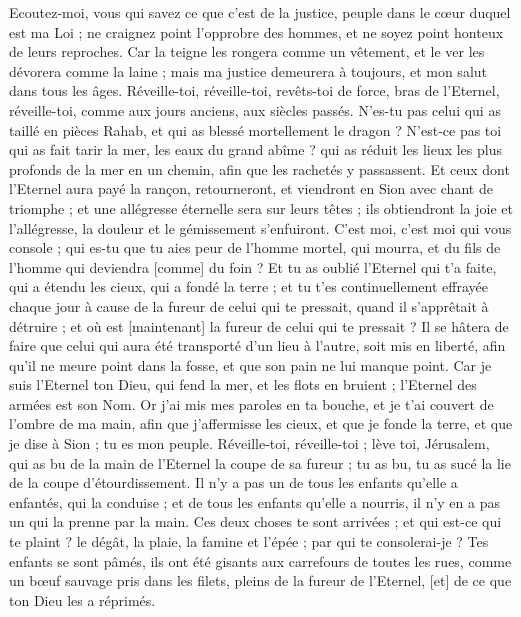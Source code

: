 \begin{multicols}{2}
Ecoutez-moi, vous qui savez ce que c'est de la justice, peuple dans le cœur duquel est ma Loi ; ne craignez point l'opprobre des hommes, et ne soyez point honteux de leurs reproches.
Car la teigne les rongera comme un vêtement, et le ver les dévorera comme la laine ; mais ma justice demeurera à toujours, et mon salut dans tous les âges.
Réveille-toi, réveille-toi, revêts-toi de force, bras de l'Eternel, réveille-toi, comme aux jours anciens, aux siècles passés. N'es-tu pas celui qui as taillé en pièces Rahab, et qui as blessé mortellement le dragon ?
N'est-ce pas toi qui as fait tarir la mer, les eaux du grand abîme ? qui as réduit les lieux les plus profonds de la mer en un chemin, afin que les rachetés y passassent.
Et ceux dont l'Eternel aura payé la rançon, retourneront, et viendront en Sion avec chant de triomphe ; et une allégresse éternelle sera sur leurs têtes ; ils obtiendront la joie et l'allégresse, la douleur et le gémissement s'enfuiront.
C'est moi, c'est moi qui vous console ; qui es-tu que tu aies peur de l'homme mortel, qui mourra, et du fils de l'homme qui deviendra [comme] du foin ?
Et tu as oublié l'Eternel qui t'a faite, qui a étendu les cieux, qui a fondé la terre ; et tu t'es continuellement effrayée chaque jour à cause de la fureur de celui qui te pressait, quand il s'apprêtait à détruire ; et où est [maintenant] la fureur de celui qui te pressait ?
Il se hâtera de faire que celui qui aura été transporté d'un lieu à l'autre, soit mis en liberté, afin qu'il ne meure point dans la fosse, et que son pain ne lui manque point.
Car je suis l'Eternel ton Dieu, qui fend la mer, et les flots en bruient ; l'Eternel des armées est son Nom.
Or j'ai mis mes paroles en ta bouche, et je t'ai couvert de l'ombre de ma main, afin que j'affermisse les cieux, et que je fonde la terre, et que je dise à Sion ; tu es mon peuple.
Réveille-toi, réveille-toi ; lève toi, Jérusalem, qui as bu de la main de l'Eternel la coupe de sa fureur ; tu as bu, tu as sucé la lie de la coupe d'étourdissement.
Il n'y a pas un de tous les enfants qu'elle a enfantés, qui la conduise ; et de tous les enfants qu'elle a nourris, il n'y en a pas un qui la prenne par la main.
Ces deux choses te sont arrivées ; et qui est-ce qui te plaint ? le dégât, la plaie, la famine et l'épée ; par qui te consolerai-je ?
Tes enfants se sont pâmés, ils ont été gisants aux carrefours de toutes les rues, comme un bœuf sauvage pris dans les filets, pleins de la fureur de l'Eternel, [et] de ce que ton Dieu les a réprimés.

\end{multicols}
